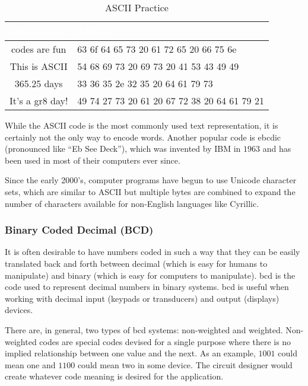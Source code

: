 \begin{table}[H]
  \sffamily
  \newcommand{\head}[1]{\textcolor{white}{\textbf{#1}}}    
  \begin{center}
    \begin{tabular}{ c l } 
      \hline
      \rowcolor{black!75}
      {\head{Plain Text}} & {\head{ASCII}} \\
      \hline    
      {codes are fun} & {63 6f 64 65 73 20 61 72 65 20 66 75 6e} \\
      {This is ASCII} & {54 68 69 73 20 69 73 20 41 53 43 49 49} \\
      {365.25 days} & {33 36 35 2e 32 35 20 64 61 79 73} \\
      {It's a gr8 day!} & {49 74 27 73 20 61 20 67 72 38 20 64 61 79 21} \\
      \hline  
    \end{tabular}
  \end{center}
  \caption{ASCII Practice}
  \label{MO:tab:ascii_practice}
\end{table}

While the ASCII code is the most commonly used text representation, it is certainly not the only way to encode words. Another popular code is \gls{ebcdic} (pronounced like ``Eb See Deck''), which was invented by IBM in $ 1963 $ and has been used in most of their computers ever since.

Since the early 2000's, computer programs have begun to use Unicode character sets, which are similar to ASCII but multiple bytes are combined to expand the number of characters available for non-English languages like Cyrillic.

\subsubsection{Binary Coded Decimal (BCD)}
\label{MO:subsub:binary_coded_decimal}

It is often desirable to have numbers coded in such a way that they can be easily translated back and forth between decimal (which is easy for humans to manipulate) and binary (which is easy for computers to manipulate). \gls{bcd} is the code used to represent decimal numbers in binary systems. \gls{bcd} is useful when working with decimal input (keypads or transducers) and output (displays) devices.

There are, in general, two types of \gls{bcd} systems: non-weighted and weighted. Non-weighted codes are special codes devised for a single purpose where there is no implied relationship between one value and the next. As an example, $ 1001 $ could mean one and $ 1100 $ could mean two in some device. The circuit designer would create whatever code meaning is desired for the application. 

